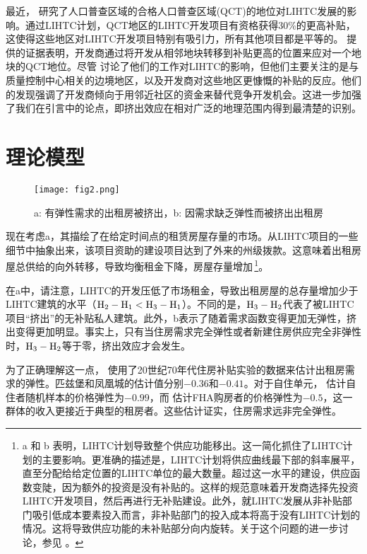 \documentclass[lang=cn,11pt,a4paper]{paper}
\begin{document}
最近，\cite{Baum-Snow2009654} 研究了人口普查区域的合格人口普查区域(QCT)的地位对LIHTC发展的影响。通过LIHTC计划，QCT地区的LIHTC开发项目有资格获得30\%的更高补贴，这使得这些地区对LIHTC开发项目特别有吸引力，所有其他项目都是平等的。\cite{Baum-Snow2009654} 提供的证据表明，开发商通过将开发从相邻地块转移到补贴更高的位置来应对一个地块的QCT地位。尽管 \cite{Baum-Snow2009654} 讨论了他们的工作对LIHTC的影响，但他们主要关注的是与质量控制中心相关的边境地区，以及开发商对这些地区更慷慨的补贴的反应。他们的发现强调了开发商倾向于用邻近社区的资金来替代竞争开发机会。这进一步加强了我们在引言中的论点，即挤出效应在相对广泛的地理范围内得到最清楚的识别。

\section{理论模型}

\begin{figure}[h]
	\centering
	\texttt{[image: fig2.png]}
	\caption{a: 有弹性需求的出租房被挤出，b: 因需求缺乏弹性而被挤出出租房}\label{fig2}
\end{figure}

现在考虑a，其描绘了在给定时间点的租赁房屋存量的市场。从LIHTC项目的一些细节中抽象出来，该项目资助的建设项目达到了外来的州级拨款。这意味着出租房屋总供给的向外转移，导致均衡租金下降，房屋存量增加\,\footnote{a 和 b 表明，LIHTC计划导致整个供应功能移出。这一简化抓住了LIHTC计划的主要影响。更准确的描述是，LIHTC计划将供应曲线最下部的斜率展平，直至分配给给定位置的LIHTC单位的最大数量。超过这一水平的建设，供应函数变陡，因为额外的投资是没有补贴的。这样的规范意味着开发商选择先投资LIHTC开发项目，然后再进行无补贴建设。此外，就LIHTC发展从非补贴部门吸引低成本要素投入而言，非补贴部门的投入成本将高于没有LIHTC计划的情况。这将导致供应功能的未补贴部分向内旋转。关于这个问题的进一步讨论，参见 \cite{Olsen2007618}。}。

在a中，请注意，LIHTC的开发压低了市场租金，导致出租房屋的总存量增加少于LIHTC建筑的水平（$\rm{H}_2-\rm{H}_1 < \rm{H}_3-\rm{H}_1$）。不同的是，$\rm{H}_3-\rm{H}_2$代表了被LIHTC项目“挤出”的无补贴私人建筑。此外，b表示了随着需求函数变得更加无弹性，挤出变得更加明显。事实上，只有当住房需求完全弹性或者新建住房供应完全非弹性时，$\rm{H}_3-\rm{H}_2$等于零，挤出效应才会发生。

为了正确理解这一点，\cite{Hanushek1980449} 使用了20世纪70年代住房补贴实验的数据来估计出租房需求的弹性。匹兹堡和凤凰城的估计值分别$-0.36$和$-0.41$。对于自住单元，\cite{Rosen19791} 估计自住者随机样本的价格弹性为$-0.99$，而 \cite{Rosen19791} 估计FHA购房者的价格弹性为$-0.5$，这一群体的收入更接近于典型的租房者。这些估计证实，住房需求远非完全弹性。
\end{document}

